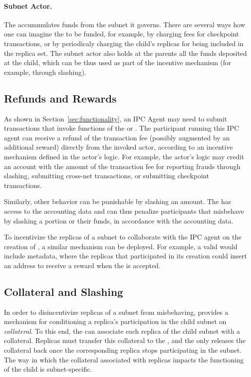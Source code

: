 \paragraph{Subnet Actor.}
The \sa accummulates funds from the subnet it governs.
There are several ways how one can imagine the \sa to be funded,
for example, by charging fees for checkpoint transactions,
or by periodicaly charging the child's replicas for being included in the replica set. The subnet actor also holds at the parents all the funds deposited at the child, which can be thus used as part of the incentive mechanism (for example, through slashing).

\subsection{Refunds and Rewards}
\label{sec:refunds-rewards}

As shown in Section~\ref{sec:functionality}, an IPC Agent may need to submit transactions that invoke functions of the \gw or \sa. The participant running this IPC agent can receive a refund of the transaction fee (possibly augmented by an additional reward) directly from the invoked actor, according to an incentive mechanism defined in the actor's logic. For example, the actor's logic may credit an account with the amount of the transaction fee for reporting frauds through slashing, submitting cross-net transactions, or submitting checkpoint transactions. 

Similarly, other behavior can be punishable by slashing an amount. The \sa has access to the accounting data and can thus penalize participants that misbehave by slashing a portion or their funds, in accordance with the accounting data. 

To incentivize the replicas of a subnet to collaborate with the IPC agent on the creation of \pofsFull, a similar mechanism can be deployed.
For example, a valid \pof would include metadata, where the replicas that participated in its creation could insert an address to receive a reward when the \pof is accepted.

\subsection{Collateral and Slashing}
\label{sec:incentives-collateral-slashing}

In order to disincentivize replicas of a subnet from misbehaving, \ipc provides a mechanism for conditioning a replica's participation in the child subnet on \emph{collateral}.
To this end, the \sa can associate each replica of the child subnet with a collateral.
Replicas must transfer this collateral to the \sa, and the \sa only releases the collateral back once the corresponding replica stops participating in the subnet. The way in which the collateral associated with replicas impacts the functioning of the child is subnet-specific.

